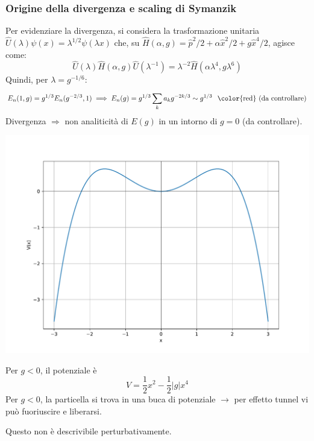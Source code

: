 \documentclass[10pt]{beamer}
\begin{document}
  \begin{frame}
\frametitle{Origine della divergenza e scaling di Symanzik}

  Per evidenziare la divergenza, si considera la trasformazione unitaria $\hat{U}(\lambda ) \psi (x) = \lambda ^{1 / 2} \psi (\lambda x)$ che, su $\hat{H}(\alpha ,g) = \hat{p}^2 / 2 + \alpha  \hat{x}^2 / 2 + g \hat{x}^4 / 2$, agisce come:
  \begin{equation*}
  	\hat{U}(\lambda ) \hat{H}(\alpha ,g) \hat{U}(\lambda ^{-1} ) = \lambda ^{-2} \hat{H}(\alpha  \lambda ^4, g \lambda ^6)
  \end{equation*}
  Quindi, per $\lambda  = g^{- 1 / 6} $:
  \[
  E_n(1,g) = g^{1 / 3} E_n(g^{-2 / 3} , 1) \implies E_n(g) = g^{1 /3 }  \sum_{k}^{} a_k g^{-2k/3} \sim g^{1 / 3} \hspace{.25cm} \text{\color{red} (da controllare)}
  \] 
  Divergenza $\Rightarrow $ non analiticit\`a di $E(g)$ in un intorno di $g=0$ {\color{red} (da controllare)}. 
  \begin{minipage}{0.45\textwidth}
    	\centering
    	\includegraphics[width=\columnwidth]{f1.pdf}
  \end{minipage}%
  \hfill
  \begin{minipage}{0.5\textwidth}
Per $g<0$, il potenziale \`e
\begin{equation*}
	V= \frac{1}{2}x^2 - \frac{1}{2}\lvert g \rvert x^4
\end{equation*}
	  Per $g<0$, la particella si trova in una buca di potenziale $\to$ per effetto tunnel vi pu\`o fuoriuscire e liberarsi.

	  Questo non \`e descrivibile perturbativamente.
  \end{minipage}
{\hspace{2cm}}
  \end{frame} 
\end{document}
